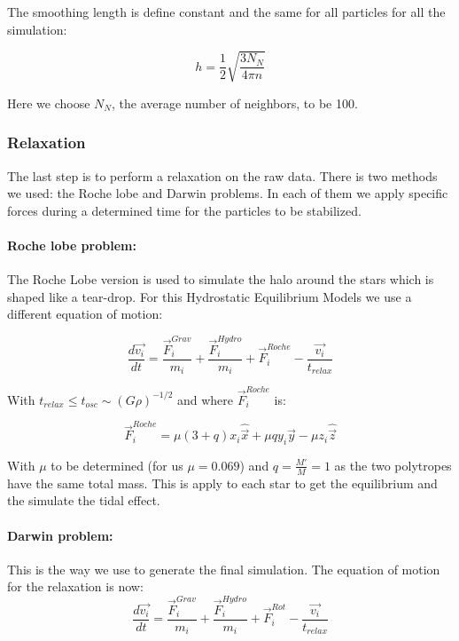 The smoothing length is define constant and the same for all particles for all the simulation:

$$ h = \frac{1}{2}\sqrt{\frac{3N_N}{4\pi n}} $$ 

Here we choose $N_N$, the average number of neighbors, to be 100.

\subsubsection{Relaxation}
The last step is to perform a relaxation on the raw data. 
There is two methods we used: the Roche lobe and Darwin problems. 
In each of them we apply specific forces during a determined time for the particles to be stabilized. 

\paragraph{Roche lobe problem: }
The Roche Lobe version is used to simulate the halo around the stars which is shaped like a tear-drop. 
For this Hydrostatic Equilibrium Models we use a different equation of motion:

\begin{equation}
\frac{d\vec{v_i}}{dt} = \frac{\vec{F}_i^{Grav}}{m_i} + \frac{\vec{F}_i^{Hydro}}{m_i} + \vec{F}_i^{Roche} - \frac{\vec{v_i}}{t_{relax}}
\end{equation}

 
With $t_{relax} \leq t_{osc} \sim (G\rho)^{-1/2}$ and 
where $\vec{F}_i^{Roche}$ is:

$$\vec{F}_i^{Roche} = \mu (3+q) x_i \hat{\vec{x}} + \mu q y_i \hat{\vec{y}}-\mu z_i \hat{\vec{z}}$$ 

With $\mu$ to be determined (for us $\mu = 0.069$) and $q = \frac{M'}{M}=1$ as the two polytropes have the same total mass.
This is apply to each star to get the equilibrium and the simulate the tidal effect. 

\paragraph{Darwin problem: }
This is the way we use to generate the final simulation. 
The equation of motion for the relaxation is now: 
\begin{equation}
\label{eq:darwin}
\frac{d\vec{v_i}}{dt} = \frac{\vec{F}_i^{Grav}}{m_i} +\frac{\vec{F}_i^{Hydro}}{m_i} + \vec{F}_i^{Rot} - \frac{\vec{v_i}}{t_{relax}}
\end{equation}

